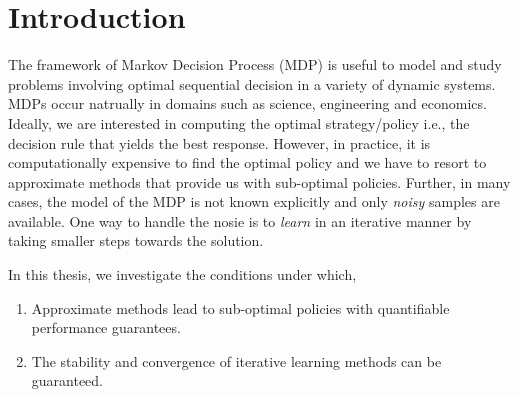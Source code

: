 \chapter{Introduction}
The framework of Markov Decision Process (MDP) is useful to model and study problems involving optimal sequential decision in a variety of dynamic systems. MDPs occur natrually in domains such as science, engineering and economics. Ideally, we are interested in computing the optimal strategy/policy i.e., the decision rule that yields the best response. However, in practice, it is computationally expensive to find the optimal policy and we have to resort to approximate methods that provide us with sub-optimal policies. Further, in many cases, the model of the MDP is not known explicitly and only \emph{noisy} samples are available. One way to handle the nosie is to \emph{learn} in an iterative manner by taking smaller steps towards the solution.\par
In this thesis, we investigate the conditions under which,
\begin{enumerate}
\item Approximate methods lead to sub-optimal policies with quantifiable performance guarantees.
\item The stability and convergence of iterative learning methods can be guaranteed.
\end{enumerate}
